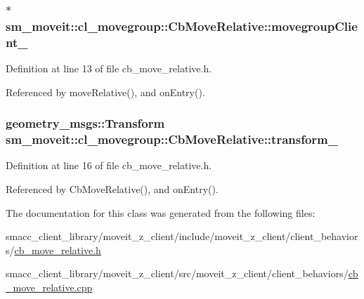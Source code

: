 \subsubsection[{\texorpdfstring{movegroup\+Client\+\_\+}{movegroupClient_}}]{$\ast$ sm\+\_\+moveit\+::cl\+\_\+movegroup\+::\+Cb\+Move\+Relative\+::movegroup\+Client\+\_\+\hspace{0.3cm}{\ttfamily [private]}}\hypertarget{classsm__moveit_1_1cl__movegroup_1_1CbMoveRelative_a4b514e5a58afa0052777268626423ece}{}\label{classsm__moveit_1_1cl__movegroup_1_1CbMoveRelative_a4b514e5a58afa0052777268626423ece}


Definition at line 13 of file cb\+\_\+move\+\_\+relative.\+h.



Referenced by move\+Relative(), and on\+Entry().

\subsubsection[{\texorpdfstring{transform\+\_\+}{transform_}}]{\setlength{\rightskip}{0pt plus 5cm}geometry\+\_\+msgs\+::\+Transform sm\+\_\+moveit\+::cl\+\_\+movegroup\+::\+Cb\+Move\+Relative\+::transform\+\_\+}\hypertarget{classsm__moveit_1_1cl__movegroup_1_1CbMoveRelative_ac0f70c737faaaeb5e63aa2a4f727d30e}{}\label{classsm__moveit_1_1cl__movegroup_1_1CbMoveRelative_ac0f70c737faaaeb5e63aa2a4f727d30e}


Definition at line 16 of file cb\+\_\+move\+\_\+relative.\+h.



Referenced by Cb\+Move\+Relative(), and on\+Entry().



The documentation for this class was generated from the following files\+:\begin{DoxyCompactItemize}
\item 
smacc\+\_\+client\+\_\+library/moveit\+\_\+z\+\_\+client/include/moveit\+\_\+z\+\_\+client/client\+\_\+behaviors/\hyperlink{cb__move__relative_8h}{cb\+\_\+move\+\_\+relative.\+h}\item 
smacc\+\_\+client\+\_\+library/moveit\+\_\+z\+\_\+client/src/moveit\+\_\+z\+\_\+client/client\+\_\+behaviors/\hyperlink{cb__move__relative_8cpp}{cb\+\_\+move\+\_\+relative.\+cpp}\end{DoxyCompactItemize}
